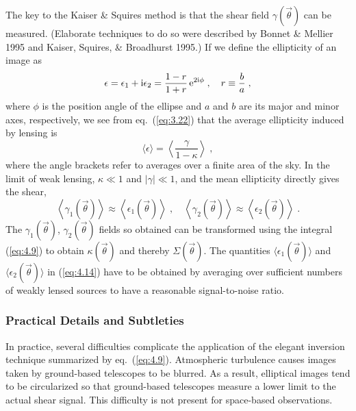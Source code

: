 \documentclass[a4paper,10pt]{article} %
\begin{document}
The key to the Kaiser \& Squires method is that the shear field
$\gamma(\vec\theta)$ can be measured. (Elaborate techniques to do so
were described by Bonnet \& Mellier 1995 and Kaiser, Squires, \&
Broadhurst 1995.) If we define the ellipticity of an image as
\begin{equation}
  \epsilon = \epsilon_1 + {\rm i}\epsilon_2 =
  \frac{1-r}{1+r}\,{\rm e}^{2{\rm i}\phi}\;,
  \quad r\equiv\frac{b}{a}\;,
\label{eq:4.12}
\end{equation}
where $\phi$ is the position angle of the ellipse and $a$ and $b$ are
its major and minor axes, respectively, we see from eq.\
(\ref{eq:3.22}) that the average ellipticity induced by lensing is
\begin{equation}
  \langle\epsilon\rangle =
  \left\langle\frac{\gamma}{1-\kappa}\right\rangle\;,
\label{eq:4.13}
\end{equation}
where the angle brackets refer to averages over a finite area of the
sky. In the limit of weak lensing, $\kappa\ll1$ and $|\gamma|\ll1$,
and the mean ellipticity directly gives the shear,
\begin{equation}
  \left\langle\gamma_1(\vec\theta)\right\rangle
     \approx \left\langle\epsilon_1(\vec\theta)\right\rangle
  \;,\quad
  \left\langle\gamma_2(\vec\theta)\right\rangle
     \approx \left\langle\epsilon_2(\vec\theta)\right\rangle
  \;.
\label{eq:4.14}
\end{equation}
The $\gamma_{1}(\vec\theta)$, $\gamma_{2}(\vec\theta)$ fields so
obtained can be transformed using the integral (\ref{eq:4.9}) to
obtain $\kappa(\vec\theta)$ and thereby $\Sigma(\vec\theta)$. The
quantities $\langle\epsilon_{1}(\vec\theta)\rangle$ and
$\langle\epsilon_{2}(\vec\theta)\rangle$ in (\ref{eq:4.14}) have to be
obtained by averaging over sufficient numbers of weakly lensed sources
to have a reasonable signal-to-noise ratio.

\subsubsection{Practical Details and Subtleties}
\label{NB:subsubsect4.2.2}

In practice, several difficulties complicate the application of the
elegant inversion technique summarized by eq.\
(\ref{eq:4.9}). Atmospheric turbulence causes images taken by
ground-based telescopes to be blurred. As a result, elliptical images
tend to be circularized so that ground-based telescopes measure a
lower limit to the actual shear signal. This difficulty is not present
for space-based observations.
\end{document}
